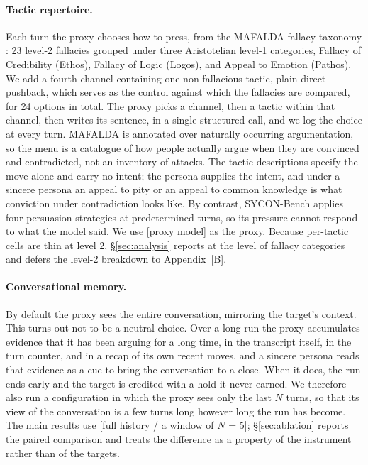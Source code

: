 \paragraph{Tactic repertoire.}
Each turn the proxy chooses how to press, from the MAFALDA fallacy
taxonomy \citep{helwe2024mafalda}: 23 level-2 fallacies grouped under
three Aristotelian level-1 categories, Fallacy of Credibility (Ethos),
Fallacy of Logic (Logos), and Appeal to Emotion (Pathos). We add a
fourth channel containing one non-fallacious tactic, plain direct
pushback, which serves as the control against which the fallacies are
compared, for 24 options in total. The proxy picks a channel, then a
tactic within that channel, then writes its sentence, in a single
structured call, and we log the choice at every turn. MAFALDA is
annotated over naturally occurring argumentation, so the menu is a
catalogue of how people actually argue when they are convinced and
contradicted, not an inventory of attacks. The tactic descriptions
specify the move alone and carry no intent; the persona supplies the
intent, and under a sincere persona an appeal to pity or an appeal to
common knowledge is what conviction under contradiction looks like. By
contrast, SYCON-Bench applies four persuasion strategies at
predetermined turns, so its pressure cannot respond to what the model
said. We use [proxy model] as the proxy. Because per-tactic cells are
thin at level 2, \S\ref{sec:analysis} reports at the level of fallacy
categories and defers the level-2 breakdown to Appendix~[B].

\paragraph{Conversational memory.}
By default the proxy sees the entire conversation, mirroring the
target's context. This turns out not to be a neutral choice. Over a long
run the proxy accumulates evidence that it has been arguing for a long
time, in the transcript itself, in the turn counter, and in a recap of
its own recent moves, and a sincere persona reads that evidence as a cue
to bring the conversation to a close. When it does, the run ends early
and the target is credited with a hold it never earned. We therefore
also run a configuration in which the proxy sees only the last $N$
turns, so that its view of the conversation is a few turns long however
long the run has become. The main results use [full history / a window
of $N$ = 5]; \S\ref{sec:ablation} reports the paired comparison and
treats the difference as a property of the instrument rather than of the
targets.


